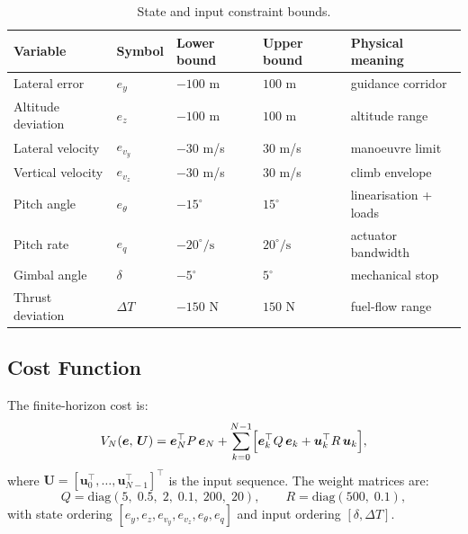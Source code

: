 \documentclass[11pt,a4paper]{article}
\newcommand{\vect}[1]{\bm{#1}}
\begin{document}
\begin{table}[h]
\centering
\caption{State and input constraint bounds.}
\label{tab:constraints}
\setlength{\tabcolsep}{8pt}
\begin{tabular}{@{}lllll@{}}
\toprule
Variable & Symbol & Lower bound & Upper bound & Physical meaning \\
\midrule
Lateral error      & $e_y$          & $-100$ m        & $100$ m         & guidance corridor \\
Altitude deviation & $e_z$          & $-100$ m        & $100$ m         & altitude range \\
Lateral velocity   & $e_{v_y}$      & $-30$ m/s       & $30$ m/s        & manoeuvre limit \\
Vertical velocity  & $e_{v_z}$      & $-30$ m/s       & $30$ m/s        & climb envelope \\
Pitch angle        & $e_\theta$     & $-15^{\circ}$          & $15^{\circ}$           & linearisation + loads \\
Pitch rate         & $e_q$          & $-20^{\circ}/\mathrm{s}$ & $20^{\circ}/\mathrm{s}$ & actuator bandwidth \\
\midrule
Gimbal angle       & $\delta$       & $-5^{\circ}$           & $5^{\circ}$            & mechanical stop \\
Thrust deviation   & $\Delta T$     & $-150$ N        & $150$ N         & fuel-flow range \\
\bottomrule
\end{tabular}
\end{table}

\subsection{Cost Function}

The finite-horizon cost is:
\begin{equation}
  V_N(\vect{e},\,\vect{U}) = \vect{e}_N^\top P\,\vect{e}_N
    + \sum_{k=0}^{N-1}\Bigl[\vect{e}_k^\top Q\,\vect{e}_k
    + \vect{u}_k^\top R\,\vect{u}_k\Bigr],
  \label{eq:cost}
\end{equation}
where $\vect{U} = [\vect{u}_0^\top,\ldots,\vect{u}_{N-1}^\top]^\top$ is the input
sequence.  The weight matrices are:
\begin{equation}
  Q = \mathrm{diag}(5,\;0.5,\;2,\;0.1,\;200,\;20), \qquad
  R = \mathrm{diag}(500,\;0.1),
  \label{eq:weights}
\end{equation}
with state ordering $[e_y, e_z, e_{v_y}, e_{v_z}, e_\theta, e_q]$ and input
ordering $[\delta, \Delta T]$.
\end{document}
